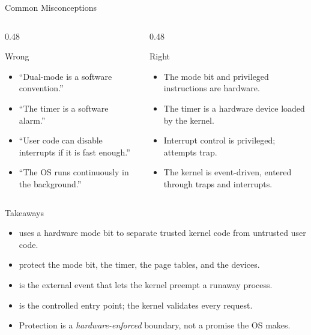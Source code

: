 \documentclass[aspectratio=169]{beamer}
\begin{document}
\begin{frame}{Common Misconceptions}
  \begin{columns}[T]
    \begin{column}{0.48\textwidth}
      \begin{block}{Wrong}
        \begin{itemize}
          \item ``Dual-mode is a software convention.''
          \item ``The timer is a software alarm.''
          \item ``User code can disable interrupts if it is fast enough.''
          \item ``The OS runs continuously in the background.''
        \end{itemize}
      \end{block}
    \end{column}
    \begin{column}{0.48\textwidth}
      \begin{block}{Right}
        \begin{itemize}
          \item The mode bit and privileged instructions are hardware.
          \item The timer is a hardware device loaded by the kernel.
          \item Interrupt control is privileged; attempts trap.
          \item The kernel is event-driven, entered through traps and interrupts.
        \end{itemize}
      \end{block}
    \end{column}
  \end{columns}
\end{frame}

\begin{frame}{Takeaways}
  \begin{itemize}
    \item {} uses a hardware mode bit to separate
      trusted kernel code from untrusted user code.
    \item {} protect the mode bit, the timer, the
      page tables, and the devices.
    \item {} is the external event that lets the kernel preempt a
      runaway process.
    \item {} is the controlled entry point; the kernel
      validates every request.
    \item Protection is a \emph{hardware-enforced} boundary, not a promise the
      OS makes.
  \end{itemize}
\end{frame}
\end{document}
